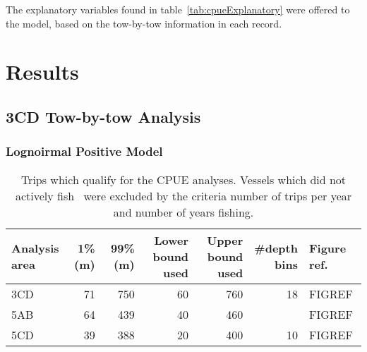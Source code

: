 The explanatory variables found in table~\ref{tab:cpueExplanatory}  were offered to the model, based on the tow-by-tow information in each record.

\section{Results}

\subsection{3CD Tow-by-tow Analysis}

\subsubsection{Lognoirmal Positive Model}


\begin{table}[b]
\centering
\caption{\label{tab:cpueTripsDepths} Trips which qualify for the CPUE analyses. Vessels which did not actively fish \fishname\ were excluded by the criteria number of trips per year and number of years fishing.}
\begin{tabular}{lrrrrrl}
\hline
\specialcell{Analysis\\area} & 1\% (m) & 99\% (m) & \specialcell{Lower bound\\used} & \specialcell{Upper bound\\used} & \specialcell{\#depth\\bins} & Figure ref. \\
\hline
3CD & 71 & 750 & 60 & 760 & 18 & FIGREF \\
5AB & 64 & 439 & 40 & 460 &    & FIGREF \\
5CD & 39 & 388 & 20 & 400 & 10 & FIGREF \\
\hline
\end{tabular}
\end{table}


